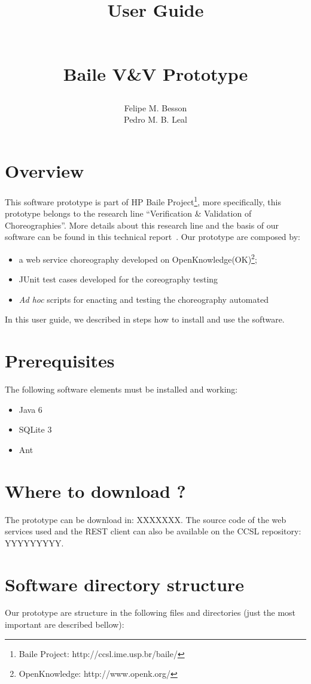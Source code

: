 \documentclass{article}	%
\author{Felipe M. Besson \\ Pedro M. B. Leal}
\title{\begin{huge}\textbf{User Guide}\end{huge} \\ Baile V\&V Prototype}
\begin{document}
	
\maketitle			

\date 

\newpage
\section { Overview }
This software prototype is part of HP Baile Project\footnote{Baile Project: http://ccsl.ime.usp.br/baile/}, more specifically, 
this prototype belongs to the research line ``Verification \& Validation of Choreographies''. More details about this research line and the
basis of our software can be found in this technical report~\cite{tech-report}. Our prototype are composed by:

\begin{itemize}
 \item a web service choreography developed on OpenKnowledge(OK)\footnote{OpenKnowledge: http://www.openk.org/};
 \item JUnit test cases developed for the coreography testing
 \item \textit{Ad hoc} scripts for enacting and testing the choreography automated
\end{itemize}

In this user guide, we described in steps how to install and use the software.


\section{ Prerequisites}
The following software elements must be installed and working:

\begin{itemize}
 \item Java 6~\cite{java6}
 \item SQLite 3~\cite{sql3}
 \item Ant~\cite{ant}
\end{itemize}

\section{ Where to download ? }
The prototype can be download in: XXXXXXX. The source code of the web services used and the REST client can also be available on the CCSL repository: YYYYYYYYY. 


\section{ Software directory structure}
Our prototype are structure in the following files and directories (just the most important are described bellow):
\end{document}
